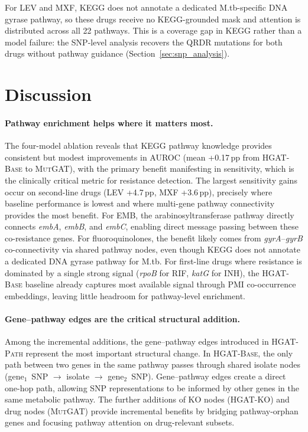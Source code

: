 \documentclass{article}
\theoremstyle{plain}
\theoremstyle{definition}
\theoremstyle{remark}
\begin{document}
For LEV and MXF, KEGG does not annotate a dedicated M.tb-specific DNA gyrase pathway, so these drugs receive no KEGG-grounded mask and attention is distributed across all 22 pathways. This is a coverage gap in KEGG rather than a model failure: the SNP-level analysis recovers the QRDR mutations for both drugs without pathway guidance (Section~\ref{sec:snp_analysis}).


\section{Discussion}
\label{sec:discussion}

\paragraph{Pathway enrichment helps where it matters most.}
The four-model ablation reveals that KEGG pathway knowledge provides consistent but modest improvements in AUROC (mean +0.17\,pp from \textsc{HGAT-Base} to \textsc{MutGAT}), with the primary benefit manifesting in sensitivity, which is the clinically critical metric for resistance detection. The largest sensitivity gains occur on second-line drugs (LEV +4.7\,pp, MXF +3.6\,pp), precisely where baseline performance is lowest and where multi-gene pathway connectivity provides the most benefit. For EMB, the arabinosyltransferase pathway directly connects \textit{embA}, \textit{embB}, and \textit{embC}, enabling direct message passing between these co-resistance genes. For fluoroquinolones, the benefit likely comes from \textit{gyrA}--\textit{gyrB} co-connectivity via shared pathway nodes, even though KEGG does not annotate a dedicated DNA gyrase pathway for M.tb. For first-line drugs where resistance is dominated by a single strong signal (\textit{rpoB} for RIF, \textit{katG} for INH), the \textsc{HGAT-Base} baseline already captures most available signal through PMI co-occurrence embeddings, leaving little headroom for pathway-level enrichment.

\paragraph{Gene--pathway edges are the critical structural addition.}
Among the incremental additions, the gene--pathway edges introduced in \textsc{HGAT-Path} represent the most important structural change. In \textsc{HGAT-Base}, the only path between two genes in the same pathway passes through shared isolate nodes (gene$_1$~SNP $\to$ isolate $\to$ gene$_2$~SNP). Gene--pathway edges create a direct one-hop path, allowing SNP representations to be informed by other genes in the same metabolic pathway. The further additions of KO nodes (\textsc{HGAT-KO}) and drug nodes (\textsc{MutGAT}) provide incremental benefits by bridging pathway-orphan genes and focusing pathway attention on drug-relevant subsets.
\end{document}
